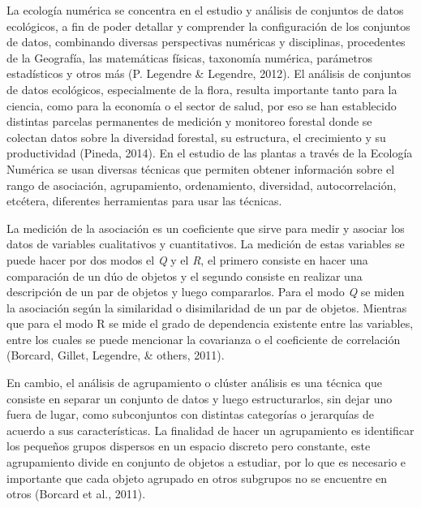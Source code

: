 \documentclass[11pt,]{article}
\begin{document}
La ecología numérica se concentra en el estudio y análisis de conjuntos
de datos ecológicos, a fin de poder detallar y comprender la
configuración de los conjuntos de datos, combinando diversas
perspectivas numéricas y disciplinas, procedentes de la Geografía, las
matemáticas físicas, taxonomía numérica, parámetros estadísticos y otros
más (P. Legendre \& Legendre, 2012). El análisis de conjuntos de datos
ecológicos, especialmente de la flora, resulta importante tanto para la
ciencia, como para la economía o el sector de salud, por eso se han
establecido distintas parcelas permanentes de medición y monitoreo
forestal donde se colectan datos sobre la diversidad forestal, su
estructura, el crecimiento y su productividad (Pineda, 2014). En el
estudio de las plantas a través de la Ecología Numérica se usan diversas
técnicas que permiten obtener información sobre el rango de asociación,
agrupamiento, ordenamiento, diversidad, autocorrelación, etcétera,
diferentes herramientas para usar las técnicas.

La medición de la asociación es un coeficiente que sirve para medir y
asociar los datos de variables cualitativos y cuantitativos. La medición
de estas variables se puede hacer por dos modos el \emph{Q} y el
\emph{R}, el primero consiste en hacer una comparación de un dúo de
objetos y el segundo consiste en realizar una descripción de un par de
objetos y luego compararlos. Para el modo \emph{Q} se miden la
asociación según la similaridad o disimilaridad de un par de objetos.
Mientras que para el modo R se mide el grado de dependencia existente
entre las variables, entre los cuales se puede mencionar la covarianza o
el coeficiente de correlación (Borcard, Gillet, Legendre, \& others,
2011).

En cambio, el análisis de agrupamiento o clúster análisis es una técnica
que consiste en separar un conjunto de datos y luego estructurarlos, sin
dejar uno fuera de lugar, como subconjuntos con distintas categorías o
jerarquías de acuerdo a sus características. La finalidad de hacer un
agrupamiento es identificar los pequeños grupos dispersos en un espacio
discreto pero constante, este agrupamiento divide en conjunto de objetos
a estudiar, por lo que es necesario e importante que cada objeto
agrupado en otros subgrupos no se encuentre en otros (Borcard et al.,
2011).
\end{document}

